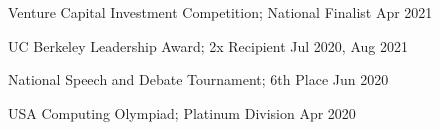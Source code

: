 Venture Capital Investment Competition; National Finalist \hfill Apr 2021\par
UC Berkeley Leadership Award; 2x Recipient \hfill Jul 2020, Aug 2021 \par
National Speech and Debate Tournament; 6th Place \hfill Jun 2020 \par
USA Computing Olympiad; Platinum Division \hfill Apr 2020 \par